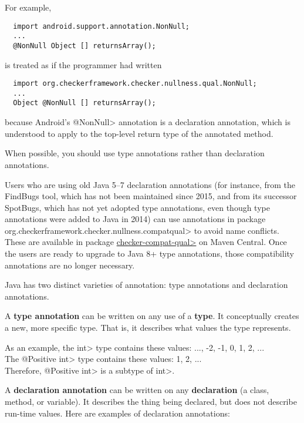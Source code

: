 For example,

\begin{Verbatim}
  import android.support.annotation.NonNull;
  ...
  @NonNull Object [] returnsArray();
\end{Verbatim}

\noindent
is treated as if the programmer had written

\begin{Verbatim}
  import org.checkerframework.checker.nullness.qual.NonNull;
  ...
  Object @NonNull [] returnsArray();
\end{Verbatim}

\noindent
because Android's \<@NonNull> annotation is a declaration annotation, which
is understood to apply to the top-level return type of the annotated method.

When possible, you should use type annotations rather than declaration
annotations.

Users who are using old Java 5--7 declaration annotations (for instance,
from the FindBugs tool, which has not been maintained since 2015, and from
its successor SpotBugs, which has not yet adopted type annotations, even
though type annotations were added to Java in 2014) can use annotations in
package \<org.checkerframework.checker.nullness.compatqual> to avoid name
conflicts.  These are available in package
\href{https://search.maven.org/search?q=a:checker-compat-qual}{\<checker-compat-qual>}
on Maven Central.  Once the users are ready to upgrade to Java 8+ type
annotations, those compatibility annotations are no longer necessary.



Java has two distinct varieties of annotation:  type annotations and
declaration annotations.

A \textbf{type annotation} can be written on any use of a \textbf{type}.
It conceptually creates a new, more specific type.
That is, it describes what values the type represents.

As an example, the \<int> type contains these values: ..., -2, -1, 0, 1, 2, ...  \\
The \<@Positive int> type contains these values:  1, 2, ...   \\
Therefore, \<@Positive int> is a subtype of \<int>.

A \textbf{declaration annotation} can be written on any \textbf{declaration} (a class, method, or variable).  It describes the thing being declared, but does not describe run-time values.  Here are examples of declaration annotations:

